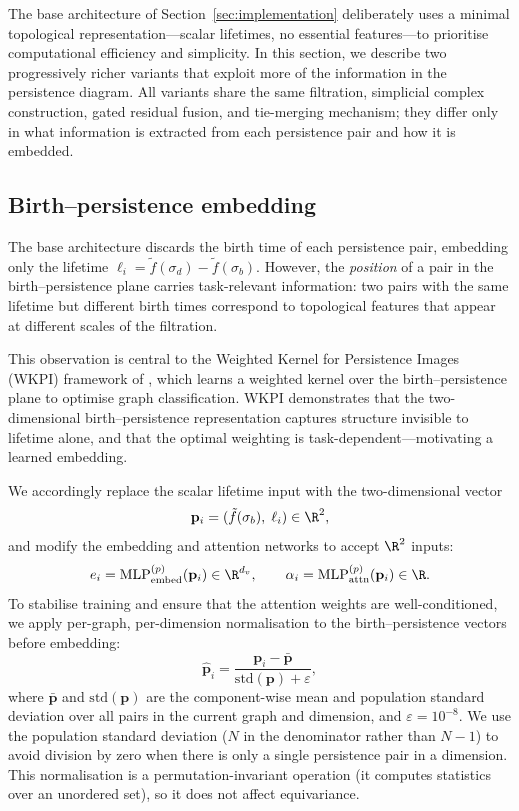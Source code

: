 The base architecture of Section~\ref{sec:implementation} deliberately uses a minimal topological representation---scalar lifetimes, no essential features---to prioritise computational efficiency and simplicity. In this section, we describe two progressively richer variants that exploit more of the information in the persistence diagram. All variants share the same filtration, simplicial complex construction, gated residual fusion, and tie-merging mechanism; they differ only in what information is extracted from each persistence pair and how it is embedded.


\subsection{Birth--persistence embedding}
\label{sec:v4}

The base architecture discards the birth time of each persistence pair, embedding only the lifetime $\ell_i = \tilde{f}(\sigma_d) - \tilde{f}(\sigma_b)$. However, the \emph{position} of a pair in the birth--persistence plane carries task-relevant information: two pairs with the same lifetime but different birth times correspond to topological features that appear at different scales of the filtration.

This observation is central to the Weighted Kernel for Persistence Images (WKPI) framework of \cite{zhao2019learning}, which learns a weighted kernel over the birth--persistence plane to optimise graph classification. WKPI demonstrates that the two-dimensional birth--persistence representation captures structure invisible to lifetime alone, and that the optimal weighting is task-dependent---motivating a learned embedding.

We accordingly replace the scalar lifetime input with the two-dimensional vector
\[
    \mathbf{p}_i = (\tilde{f}(\sigma_b),\; \ell_i) \in \R^2,
\]
and modify the embedding and attention networks to accept $\R^2$ inputs:
\[
    e_i = \mathrm{MLP}^{(p)}_{\mathrm{embed}}(\mathbf{p}_i) \in \R^{d_v}, \qquad
    \alpha_i = \mathrm{MLP}^{(p)}_{\mathrm{attn}}(\mathbf{p}_i) \in \R.
\]
To stabilise training and ensure that the attention weights are well-conditioned, we apply per-graph, per-dimension normalisation to the birth--persistence vectors before embedding:
\[
    \hat{\mathbf{p}}_i = \frac{\mathbf{p}_i - \bar{\mathbf{p}}}{\mathrm{std}(\mathbf{p}) + \varepsilon},
\]
where $\bar{\mathbf{p}}$ and $\mathrm{std}(\mathbf{p})$ are the component-wise mean and population standard deviation over all pairs in the current graph and dimension, and $\varepsilon = 10^{-8}$. We use the population standard deviation ($N$ in the denominator rather than $N-1$) to avoid division by zero when there is only a single persistence pair in a dimension. This normalisation is a permutation-invariant operation (it computes statistics over an unordered set), so it does not affect equivariance.

